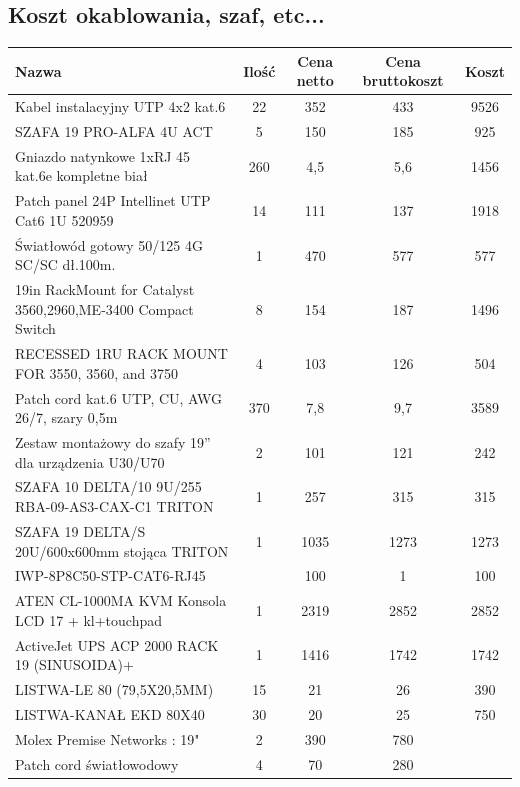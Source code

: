 \subsection{Koszt okablowania, szaf, etc...}
\begin{center}
    \begin{tabular}{|p{6cm}|c|c|c|c|}
    \hline
Nazwa &	Ilość	&Cena netto	&Cena bruttokoszt	&Koszt \\ \hline
Kabel instalacyjny UTP 4x2 kat.6	&22&	352	&433	&9526\\ \hline
SZAFA 19 PRO-ALFA 4U ACT	&5	&150	&185	&925\\ \hline
Gniazdo natynkowe 1xRJ 45 kat.6e kompletne biał	&260	&4,5	&5,6	&1456\\ \hline
Patch panel 24P Intellinet UTP Cat6 1U 520959	&14	&111	&137	&1918\\ \hline
Światłowód gotowy 50/125 4G SC/SC dł.100m.	&1&	470&	577&	577\\ \hline
19in RackMount for Catalyst 3560,2960,ME-3400 Compact Switch	&8	&154	&187	&1496\\ \hline
RECESSED 1RU RACK MOUNT FOR 3550, 3560, and 3750	&4	&103	&126	&504\\ \hline
Patch cord kat.6 UTP, CU, AWG 26/7, szary 0,5m&	370&	7,8&	9,7&	3589\\ \hline
Zestaw montażowy do szafy 19” dla urządzenia U30/U70	&2	&101	&121	&242\\ \hline
SZAFA 10 DELTA/10 9U/255 RBA-09-AS3-CAX-C1 TRITON	&1	&257	&315	&315\\ \hline
SZAFA 19 DELTA/S 20U/600x600mm stojąca TRITON	&1	&1035	&1273	&1273 \\ \hline
IWP-8P8C50-STP-CAT6-RJ45&	&100		&1	&100\\ \hline
ATEN CL-1000MA KVM Konsola LCD 17 + kl+touchpad	&1	&2319	&2852	&2852 \\ \hline
ActiveJet UPS ACP 2000 RACK 19 (SINUSOIDA)+	&1	&1416	&1742	&1742 \\ \hline
LISTWA-LE 80  (79,5X20,5MM)&15	& 21 	&26	&390 \\ \hline
LISTWA-KANAŁ EKD 80X40	& 30	& 20 & 25	&750 \\ \hline
Molex Premise Networks : 19"	&2	&	390&	780\\ \hline
Patch cord światłowodowy	&4		&70	&280\\ \hline
\end{tabular}
\end{center}


